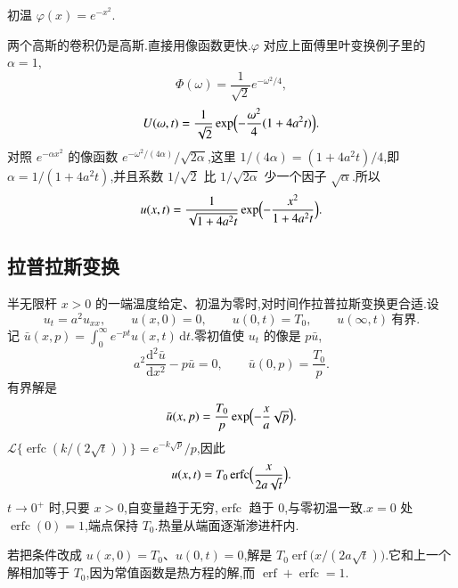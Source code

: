 \begin{example}
初温 $\varphi(x)=e^{-x^2}$.
\end{example}
\begin{solution}
两个高斯的卷积仍是高斯.直接用像函数更快.$\varphi$ 对应上面傅里叶变换例子里的 $\alpha=1$,
\begin{equation}
  \Phi(\omega)=\frac{1}{\sqrt{2}}e^{-\omega^2/4},
\end{equation}
\begin{equation}
  U(\omega,t)=\frac{1}{\sqrt{2}}
  \exp\Bigl(-\frac{\omega^2}{4}(1+4a^2 t)\Bigr).
\end{equation}
对照 $e^{-\alpha x^2}$ 的像函数 $e^{-\omega^2/(4\alpha)}/\sqrt{2\alpha}$,这里 $1/(4\alpha)=(1+4a^2 t)/4$,即 $\alpha=1/(1+4a^2 t)$,并且系数 $1/\sqrt{2}$ 比 $1/\sqrt{2\alpha}$ 少一个因子 $\sqrt{\alpha}$.所以
\begin{equation}
  u(x,t)=\frac{1}{\sqrt{1+4a^2 t}}
  \exp\Bigl(-\frac{x^2}{1+4a^2 t}\Bigr).
\end{equation}
\end{solution}

\subsection{拉普拉斯变换}
半无限杆 $x>0$ 的一端温度给定、初温为零时,对时间作拉普拉斯变换更合适.设
\begin{equation}
  u_t=a^2 u_{xx},
  \qquad
  u(x,0)=0,
  \qquad
  u(0,t)=T_0,
  \qquad
  u(\infty,t)\ \textrm{有界}.
\end{equation}
记 $\bar u(x,p)=\int_0^{\infty} e^{-pt}u(x,t)\,\mathrm{d}t$.零初值使 $u_t$ 的像是 $p\bar u$,
\begin{equation}
  a^2\frac{\mathrm{d}^2\bar u}{\mathrm{d}x^2}-p\bar u=0,
  \qquad
  \bar u(0,p)=\frac{T_0}{p}.
\end{equation}
有界解是
\begin{equation}
  \bar u(x,p)=\frac{T_0}{p}\exp\Bigl(-\frac{x}{a}\sqrt{p}\Bigr).
\end{equation}
$\mathcal{L}\{\operatorname{erfc}(k/(2\sqrt{t}))\}=e^{-k\sqrt{p}}/p$,因此
\begin{equation}
  u(x,t)=T_0\operatorname{erfc}\Bigl(\frac{x}{2a\sqrt{t}}\Bigr).
\end{equation}
$t\to 0^+$ 时,只要 $x>0$,自变量趋于无穷,$\operatorname{erfc}$ 趋于 $0$,与零初温一致.$x=0$ 处 $\operatorname{erfc}(0)=1$,端点保持 $T_0$.热量从端面逐渐渗进杆内.

若把条件改成 $u(x,0)=T_0$、$u(0,t)=0$,解是 $T_0\operatorname{erf}\bigl(x/(2a\sqrt{t})\bigr)$.它和上一个解相加等于 $T_0$,因为常值函数是热方程的解,而 $\operatorname{erf}+\operatorname{erfc}=1$.

